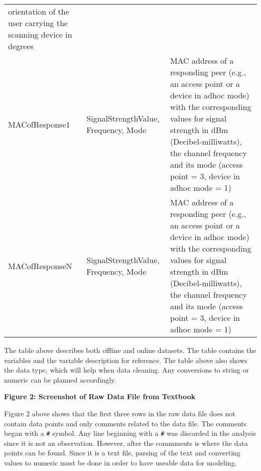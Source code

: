 \documentclass[11pt]{article}
\begin{document}
\begin{longtable}[]{@{}lll@{}}
\begin{minipage}[t]{0.74\columnwidth}
orientation of the user carrying the scanning device in degrees\strut
\end{minipage}\tabularnewline
\begin{minipage}[t]{0.05\columnwidth}\raggedright\strut
MACofResponse1\strut
\end{minipage} & \begin{minipage}[t]{0.12\columnwidth}\raggedright\strut
SignalStrengthValue, Frequency, Mode\strut
\end{minipage} & \begin{minipage}[t]{0.74\columnwidth}\raggedright\strut
MAC address of a responding peer (e.g., an access point or a device in
adhoc mode) with the corresponding values for signal strength in dBm
(Decibel-milliwatts), the channel frequency and its mode (access point =
3, device in adhoc mode = 1)\strut
\end{minipage}\tabularnewline
\begin{minipage}[t]{0.05\columnwidth}\raggedright\strut
MACofResponseN\strut
\end{minipage} & \begin{minipage}[t]{0.12\columnwidth}\raggedright\strut
SignalStrengthValue, Frequency, Mode\strut
\end{minipage} & \begin{minipage}[t]{0.74\columnwidth}\raggedright\strut
MAC address of a responding peer (e.g., an access point or a device in
adhoc mode) with the corresponding values for signal strength in dBm
(Decibel-milliwatts), the channel frequency and its mode (access point =
3, device in adhoc mode = 1)\strut
\end{minipage}\tabularnewline
\bottomrule
\end{longtable}

The table above describes both offline and online datasets. The table
contains the variables and the variable description for reference. The
table above also shows the data type, which will help when data
cleaning. Any conversions to string or numeric can be planned
accordingly.

\textbf{Figure 2: Screenshot of Raw Data File from Textbook}

 Figure 2 above shows that the first three rows in the raw data file
does not contain data points and only comments related to the data file.
The comments began with a \texttt{\#} symbol. Any line beginning with a
\texttt{\#} was discarded in the analysis since it is not an
observation. However, after the commments is where the data points can
be found. Since it is a text file, parsing of the text and converting
values to numeric must be done in order to have useable data for
modeling.
\end{document}
